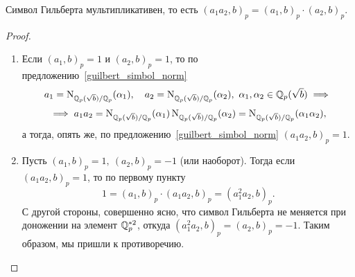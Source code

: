 	\begin{statement}\label{gilb_mult} 
		Символ Гильберта мультипликативен, то есть $(a_1 a_2, b)_p = (a_1, b)_p \cdot (a_2, b)_p$.
	\end{statement}
	\begin{proof}
		\begin{enumerate}
			\item Если $(a_1, b)_p = 1$ и $(a_2, b)_p = 1$, то по предложению~\ref{guilbert_simbol_norm}
			\[
				a_1 = \operatorname{\mathrm{N}}_{\mathbb{Q}_{p}(\sqrt{b})/\mathbb{Q}_{p}}(\alpha_1), \quad a_2 = \operatorname{\mathrm{N}}_{\mathbb{Q}_{p}(\sqrt{b})/\mathbb{Q}_{p}}(\alpha_2), \ \alpha_1, \alpha_2 \in \mathbb{Q}_{p}(\sqrt{b}) \implies 
			\]
			\[
				\implies a_1 a_2 =   \operatorname{\mathrm{N}}_{\mathbb{Q}_{p}(\sqrt{b})/\mathbb{Q}_{p}}(\alpha_1) \operatorname{\mathrm{N}}_{\mathbb{Q}_{p}(\sqrt{b})/\mathbb{Q}_{p}}(\alpha_2) = \operatorname{\mathrm{N}}_{\mathbb{Q}_{p}(\sqrt{b})/\mathbb{Q}_{p}}(\alpha_1 \alpha_2),
			\]
			а тогда, опять же, по предложению~\ref{guilbert_simbol_norm} $(a_1 a_2, b)_{p} = 1$.

			\item Пусть $(a_1, b)_{p} = 1, \ (a_{2}, b)_{p} = -1$ (или наоборот). Тогда если $(a_1 a_2, b)_{p} = 1$, то по первому пункту 
			\[
			 	1 = (a_1, b)_{p} \cdot (a_1 a_2, b)_{p} = (a_1^{2}a_2, b)_{p}.
			 \] 
			 С другой стороны, совершенно ясно, что символ Гильберта не меняется при доножении на элемент $\mathbb{Q}_{p}^{*2}$, откуда $(a_1^{2}a_2, b)_{p} = (a_2, b)_{p} = -1$. Таким образом, мы пришли к противоречию. 


\end{enumerate}
\end{proof}
